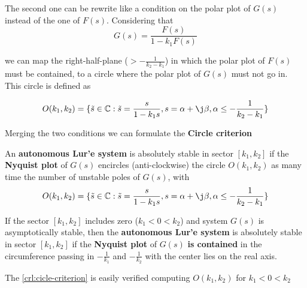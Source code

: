 The second one can be rewrite like a condition on the polar plot of $G(s)$ instead of the one of $F(s)$. Considering that
\[
    G(s) = \frac{F(s)}{1 - k_1 F(s)}
\]

we can map the right-half-plane ($>-\frac{1}{k_2 - k_1}$) in which the polar plot of $F(s)$ must be contained, to a circle where the polar plot of $G(s)$ must not go in. This circle is defined as

\[
    O(k_1,k_2) = \{\tilde{s} \in \Complex : \tilde{s} = \frac{s}{1-k_1 s}, s = \alpha + \j \beta, \alpha \leq - \frac{1}{k_2 - k_1}\}
\]

Merging the two conditions we can formulate the \textbf{Circle criterion}

\begin{theorem}
    An \textbf{autonomous Lur'e system} is absolutely stable in sector $[k_1,k_2]$ if the \textbf{Nyquist plot} of $G(s)$ encircles (anti-clockwise) the circle $O(k_1, k_2)$ as many time the number of unstable poles of $G(s)$, with
    \[
        O(k_1,k_2) = \{\tilde{s} \in \Complex : \tilde{s} = \frac{s}{1-k_1 s}, s = \alpha + \j \beta, \alpha \leq - \frac{1}{k_2 - k_1}\}
    \]
\end{theorem}

\begin{corollary}\label{crl:cicle-criterion}
    If the sector $[k_1,k_2]$ includes zero ($k_1 < 0 < k_2$) and system $G(s)$ is asymptotically stable, then the \textbf{autonomous Lur'e system} is absolutely stable in sector $[k_1,k_2]$ if the \textbf{Nyquist plot} of $G(s)$ \textbf{is contained} in the circumference passing in $-\frac{1}{k_1}$ and $-\frac{1}{k_2}$ with the center lies on the real axis.
\end{corollary}

\begin{nb}The \cref{crl:cicle-criterion} is easily verified computing $O(k_1,k_2)$ for $k_1 < 0 < k_2$\end{nb}